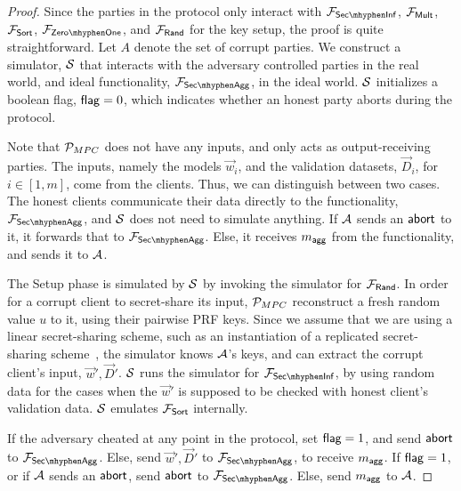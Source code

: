 \begin{proof}
    Since the parties in the protocol only interact with $\FSecInf$, $\mathcal{F}_{\mathsf{Mult}}$, $\mathcal{F}_{\mathsf{Sort}}$, $\FZeroOne$, and $\mathcal{F}_{\mathsf{Rand}}$ for the key setup, the proof is quite straightforward. Let $A$ denote the set of corrupt parties. We construct a simulator, $\mathcal{S}$ that interacts with the adversary controlled parties in the real world, and ideal functionality, $\FSecAgg$, in the ideal world. $\mathcal{S}$ initializes a boolean flag, $\mathsf{flag} = 0$, which indicates whether an honest party aborts during the protocol.

    Note that $\mathcal{P}_{MPC}$ does not have any inputs, and only acts as output-receiving parties. The inputs, namely the models $\vec w_i$, and the validation datasets, $\vec D_i$, for $i \in [1, m]$, come from the clients. Thus, we can distinguish between two cases. The honest clients communicate their data directly to the functionality, $\FSecAgg$, and $\mathcal{S}$ does not need to simulate anything. If $\mathcal{A}$ sends an $\mathsf{abort}$ to it, it forwards that to $\FSecAgg$. Else, it receives $m_{\mathsf{agg}}$ from the functionality, and sends it to $\mathcal{A}$.

    The Setup phase is simulated by $\mathcal{S}$ by invoking the simulator for $\mathcal{F}_{\mathsf{Rand}}$. In order for a corrupt client to secret-share its input, $\mathcal{P}_{MPC}$ reconstruct a fresh random value $u$ to it, using their pairwise PRF keys.
    Since we assume that we are using a linear secret-sharing scheme, such as an instantiation of a replicated secret-sharing scheme~\cite{CCS:MohRin18,USENIX:DalEscKel21,tetrad,EPRINT:FLNW16}, the simulator knows $\mathcal{A}$'s keys, and can extract the corrupt client's input, $\vec w', \vec D'$. $\mathcal{S}$ runs the simulator for $\FSecInf$, by using random data for the cases when the $\vec w'$ is supposed to be checked with honest client's validation data. $\mathcal{S}$ emulates $\mathcal{F}_{\mathsf{Sort}}$ internally.

    If the adversary cheated at any point in the protocol, set $\mathsf{flag} = 1$, and send $\mathsf{abort}$ to $\FSecAgg$. Else, send $\vec w', \vec D'$ to $\FSecAgg$, to receive $m_{\mathsf{agg}}$. If $\mathsf{flag} = 1$, or if $\mathcal{A}$ sends an $\mathsf{abort}$, send $\mathsf{abort}$ to $\FSecAgg$. Else, send $m_{\mathsf{agg}}$ to $\mathcal{A}$.

    
\end{proof}
